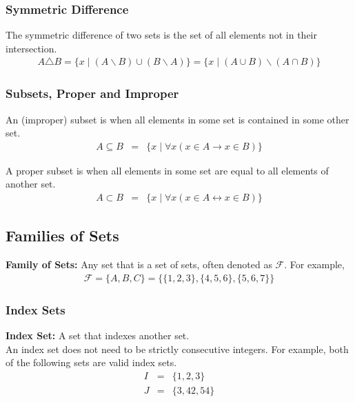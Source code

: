 \documentclass{article}
\begin{document}
\subsubsection{Symmetric Difference}
The symmetric difference of two sets is the set of all elements not in 
their intersection.
\begin{eqnarray}
    A \triangle B = \{ x \; | \; (A \backslash B) \cup (B \backslash A)\} = \{ x \; | \; (A \cup B) \backslash (A \cap B) \}
\end{eqnarray}

\subsubsection{Subsets, Proper and Improper}
An (improper) subset is when all elements in some set is contained in some
other set. \\
\begin{eqnarray}
    A \subseteq B &=& \{ x \; | \; \forall x(x \in A \rightarrow x \in B) \}
\end{eqnarray}

\noindent A proper subset is when all elements in some set are equal to all elements of
another set.
\begin{eqnarray}
    A \subset B &=& \{ x \; | \; \forall x(x \in A \leftrightarrow x \in B) \}
\end{eqnarray}

\subsection{Families of Sets}
\textbf{Family of Sets:} Any set that is a set of sets, often denoted as $\mathcal{F}$. For example,
\begin{eqnarray} \nonumber
    \mathcal{F} = \{A, B, C\} = \{\{1, 2, 3\}, \{4, 5, 6\}, \{5, 6, 7\}\}
\end{eqnarray}

\subsubsection{Index Sets}
\textbf{Index Set:} A set that indexes another set. \\

\noindent An index set does not need to be strictly consecutive integers. For example,
both of the following sets are valid index sets.
\begin{eqnarray} \nonumber
    I &=& \{1, 2, 3\} \\ \nonumber
    J &=& \{3, 42, 54\}
\end{eqnarray}
\end{document}

